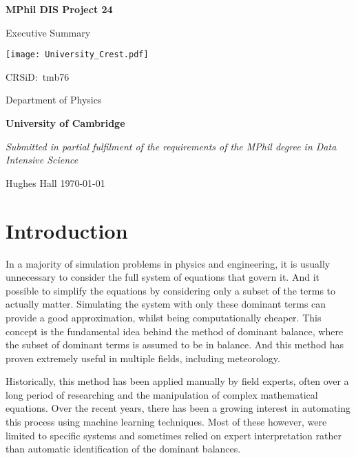 \documentclass[12pt]{report} %
\begin{document}
\begin{titlepage}
	\centering
	{\LARGE\bfseries MPhil DIS Project 24\par}
	{\LARGE Executive Summary\par}
	\vspace{1cm}
	{\texttt{[image: University\_Crest.pdf]}\par}
	{\Large CRSiD:\ tmb76\par}
	\vspace{1cm}
	{\Large Department of Physics\par}
	{\Large\bfseries University of Cambridge\par}
	\vfill
	{\itshape Submitted in partial fulfilment of the requirements of the MPhil degree in Data Intensive Science}
	\vfill
	{\large Hughes Hall  \hspace{6cm} \today\par}
\end{titlepage}


\tableofcontents


\section{Introduction}


In a majority of simulation problems in physics and engineering, it is usually unnecessary to consider the full system of equations that govern it. And it possible to simplify the equations by considering only a subset of the terms to actually matter. Simulating the system with only these dominant terms can provide a good approximation, whilst being computationally cheaper. This concept is the fundamental idea behind the method of dominant balance, where the subset of dominant terms is assumed to be in balance. And this method has proven extremely useful in multiple fields, including meteorology\cite{charney1947dynamics, phillips1963geostrophic, burger1958scale, yano2009scale}.

\vspace{5mm}

Historically, this method has been applied manually by field experts, often over a long period of researching and the manipulation of complex mathematical equations. Over the recent years, there has been a growing interest in automating this process using machine learning techniques. Most of these however, were limited to specific systems and sometimes relied on expert interpretation rather than automatic identification of the dominant balances\cite{portwood2016robust,lee2018detection,sonnewald2019unsupervised}.
\end{document}
